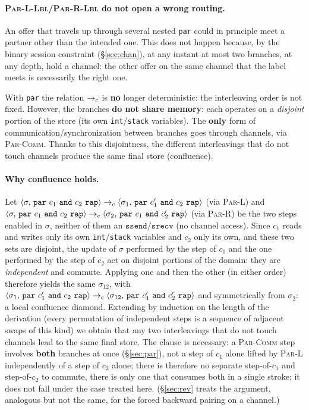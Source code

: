 \paragraph{\textsc{Par-L-Lbl}/\textsc{Par-R-Lbl} do not open a wrong
routing.} An offer that travels up through several nested \texttt{par} could
in principle meet a partner other than the intended one. This does not happen because,
by the binary session constraint (\S\ref{sec:chan}), at any instant at most
two branches, at any depth, hold a channel: the other offer
on the same channel that the label meets is necessarily the right one.

\medskip
\noindent
With \texttt{par} the relation $\toc$ is \textbf{no} longer deterministic: the
interleaving order is not fixed. However, the branches \textbf{do not share memory}:
each operates on a \emph{disjoint} portion of the store (its own
\texttt{int}/\texttt{stack} variables). The \textbf{only} form of
communication/synchronization between branches goes through channels, via
\textsc{Par-Comm}. Thanks to this disjointness, the different interleavings that do not
touch channels produce the same final store (confluence).

\paragraph{Why confluence holds.}
\label{sec:par-conf}
Let $\cfg{\mathtt{par}\ c_1\
\mathtt{and}\ c_2\ \mathtt{rap}}{\sigma} \toc \cfg{\mathtt{par}\ c_1'\
\mathtt{and}\ c_2\ \mathtt{rap}}{\sigma_1}$ (via \textsc{Par-L}) and
$\cfg{\mathtt{par}\ c_1\ \mathtt{and}\ c_2\ \mathtt{rap}}{\sigma} \toc
\cfg{\mathtt{par}\ c_1\ \mathtt{and}\ c_2'\ \mathtt{rap}}{\sigma_2}$ (via
\textsc{Par-R}) be the two steps enabled in $\sigma$, neither of them an
$\mathtt{ssend}/\mathtt{srecv}$ (no channel access). Since $c_1$ reads and
writes only its own \texttt{int}/\texttt{stack} variables and $c_2$ only its
own, and these two sets are disjoint, the update of $\sigma$
performed by the step of $c_1$ and the one performed by the step of $c_2$ act on
disjoint portions of the domain: they are \emph{independent} and commute.
Applying one and then the other (in either order) therefore yields
the same $\sigma_{12}$, with $\cfg{\mathtt{par}\ c_1'\ \mathtt{and}\
c_2\ \mathtt{rap}}{\sigma_1} \toc \cfg{\mathtt{par}\ c_1'\ \mathtt{and}\
c_2'\ \mathtt{rap}}{\sigma_{12}}$ and symmetrically from $\sigma_2$: a
local confluence diamond. Extending by induction on the length of the
derivation (every permutation of independent steps is a sequence of
adjacent swaps of this kind) we obtain that any two interleavings
that do not touch channels lead to the same final store. The clause is
necessary: a \textsc{Par-Comm} step involves \textbf{both} branches
at once (\S\ref{sec:par}), not a step of $c_1$ alone lifted by
\textsc{Par-L} independently of a step of $c_2$ alone; there is therefore no
separate step-of-$c_1$ and step-of-$c_2$ to commute, there is only one
that consumes both in a single stroke; it does not fall under the case treated here.
(\S\ref{sec:rev} treats the argument, analogous but not the same, for
the forced backward pairing on a channel.)

